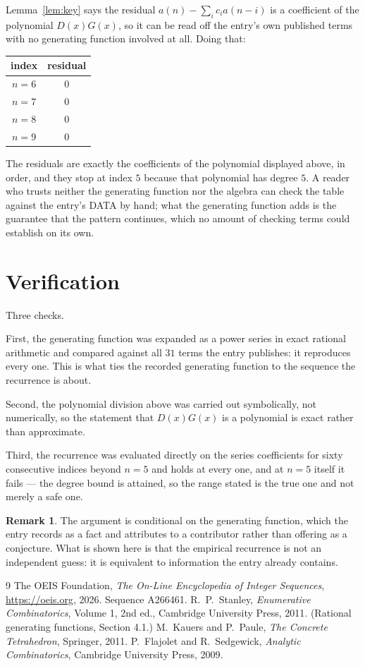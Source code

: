 \documentclass[11pt,a4paper]{article}
\theoremstyle{plain}
\theoremstyle{definition}
\newtheorem{remark}[theorem]{Remark}
\begin{document}
Lemma~\ref{lem:key} says the residual $a(n)-\sum_ic_ia(n-i)$ is a coefficient of the
polynomial $D(x)G(x)$, so it can be read off the entry's own published terms with no
generating function involved at all. Doing that:
\begin{center}
\begin{tabular}{cc}
index & residual \\ \hline
$n=6$ & $0$ \\
$n=7$ & $0$ \\
$n=8$ & $0$ \\
$n=9$ & $0$
\end{tabular}
\end{center}
The residuals are exactly the coefficients of the polynomial displayed above, in order, and
they stop at index $5$ because that polynomial has degree $5$. A reader who trusts
neither the generating function nor the algebra can check the table against the entry's DATA
by hand; what the generating function adds is the guarantee that the pattern continues, which
no amount of checking terms could establish on its own.

\section{Verification}

Three checks.

First, the generating function was expanded as a power series in exact rational arithmetic and
compared against all $31$ terms the entry publishes: it reproduces every one. This is
what ties the recorded generating function to the sequence the recurrence is about.

Second, the polynomial division above was carried out symbolically, not numerically, so the
statement that $D(x)G(x)$ is a polynomial is exact rather than approximate.

Third, the recurrence was evaluated directly on the series coefficients for sixty consecutive
indices beyond $n=5$ and holds at every one, and at $n=5$ itself it fails --- the
degree bound is attained, so the range stated is the true one and not merely a safe one.

\begin{remark}
The argument is conditional on the generating function, which the entry records as a fact and
attributes to a contributor rather than offering as a conjecture. What is shown here is that
the empirical recurrence is not an independent guess: it is equivalent to information the
entry already contains.
\end{remark}

\begin{thebibliography}{9}
 The OEIS Foundation, \emph{The On-Line Encyclopedia of Integer
Sequences}, \url{https://oeis.org}, 2026. Sequence A266461.
 R.~P.~Stanley, \emph{Enumerative Combinatorics}, Volume 1, 2nd ed.,
Cambridge University Press, 2011. (Rational generating functions, Section 4.1.)
 M.~Kauers and P.~Paule, \emph{The Concrete Tetrahedron}, Springer, 2011.
 P.~Flajolet and R.~Sedgewick, \emph{Analytic Combinatorics}, Cambridge
University Press, 2009.
\end{thebibliography}
\end{document}
